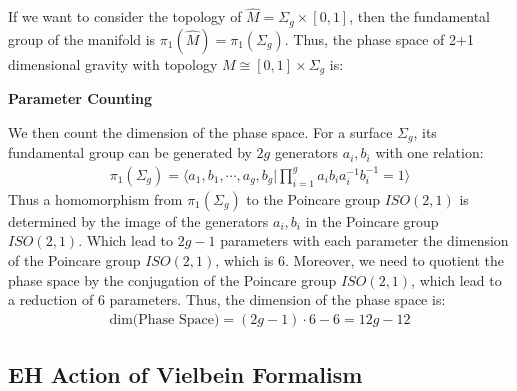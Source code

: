 If we want to consider the topology of $ \hat{M} = \Sigma_g \times [0,1] $,
then the fundamental group of the manifold is $ \pi_1(\hat{M}) =
\pi_1(\Sigma_g) $. Thus, the phase space of 2+1 dimensional gravity
with topology $ M \cong [0,1] \times \Sigma_g $ is:

\textbf{Parameter Counting}

We then count the dimension of the phase space. For a surface $
\Sigma_g $, its fundamental group can be generated by $ 2g $
generators $ a_i, b_i $ with one relation:
\begin{align}
  \pi_1(\Sigma_g) = \langle a_1, b_1, \cdots, a_g, b_g |
  \prod_{i=1}^g a_i b_i a_i^{-1} b_i^{-1} = 1 \rangle
\end{align}
Thus a homomorphism from $ \pi_1(\Sigma_g) $ to the Poincare group
$ ISO(2,1) $ is determined by the image of the generators $ a_i, b_i $
in the Poincare group $ ISO(2,1) $. Which lead to $ 2g-1 $ parameters
with each parameter the dimension of the Poincare group $ ISO(2,1) $,
which is 6. Moreover, we need to quotient the phase space by the
conjugation of the Poincare group $ ISO(2,1) $, which lead to a
reduction of $ 6 $ parameters. Thus, the dimension of the phase space is:
\begin{align}
  \text{dim(Phase Space)} = (2g-1) \cdot 6 - 6 = 12g - 12
\end{align}


\subsection{EH Action of Vielbein Formalism}

